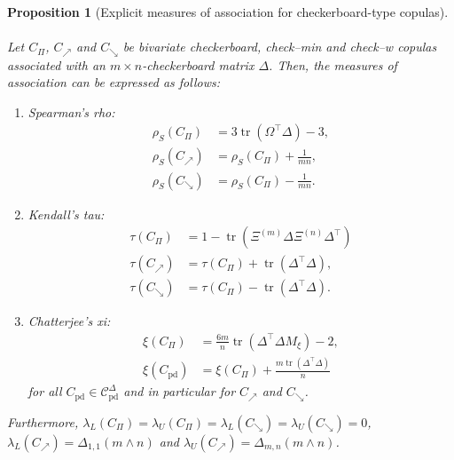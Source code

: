 \documentclass{article}
\newtheorem{proposition}[thm]{Proposition}
\theoremstyle{definition}
\newcommand{\CC}{\mathcal{C}}  %
\DeclareMathOperator{\tr}{tr}  %
\begin{document}
\begin{proposition}[Explicit measures of association for checkerboard-type copulas]
    \label{lem:checkerboard_measures_of_association}~\\
    Let $C_{\Pi}$, $C_{\nearrow}$ and $C_{\searrow}$ be bivariate checkerboard, check--min and check--w copulas associated with an $m\times n$-checkerboard matrix $\Delta$.
    Then, the measures of association can be expressed as follows:
    \begin{enumerate}[label=(\roman*)]
        \item \label{itm:rho_checkerboard} Spearman's rho:
        \begin{align*}
            \rho_S(C_{\Pi}) &= 3\tr\left(\Omega^\top\Delta\right)-3, \\
            \rho_S(C_{\nearrow}) &= \rho_S(C_{\Pi}) + \frac1{mn}, \\
            \rho_S(C_{\searrow}) &= \rho_S(C_{\Pi}) - \frac1{mn}.
        \end{align*}
        \item \label{itm:tau_checkerboard} Kendall's tau:
        \begin{align*}
            \tau(C_{\Pi}) &= 1
            -
            \tr\left(\Xi^{(m)}\Delta\Xi^{(n)}\Delta^\top\right) \\
            \tau(C_{\nearrow}) &= \tau(C_{\Pi}) + \tr(\Delta^\top \Delta), \\
            \tau(C_{\searrow}) &= \tau(C_{\Pi}) - \tr(\Delta^\top \Delta).
        \end{align*}
        \item \label{itm:xi_checkerboard} Chatterjee's xi:
        \begin{align*}
            \xi(C_{\Pi}) &= \frac{6m}{n}\tr\left(\Delta^\top \Delta M_{\xi}\right) -2, \\
            \xi(C_{\text{pd}}) &= \xi(C_{\Pi}) + \frac{m\tr(\Delta^\top \Delta)}n
        \end{align*}
        for all $C_{\text{pd}}\in\CC^{\Delta}_{\text{pd}}$ and in particular for $C_{\nearrow}$ and $C_{\searrow}$.
    \end{enumerate}
    Furthermore, $\lambda_L(C_{\Pi}) = \lambda_U(C_{\Pi}) = \lambda_L(C_{\searrow}) = \lambda_U(C_{\searrow}) = 0$, $\lambda_L(C_{\nearrow}) = \Delta_{1, 1}(m\wedge n)$ and $\lambda_U(C_{\nearrow}) = \Delta_{m, n}(m\wedge n)$.
\end{proposition}
\end{document}
